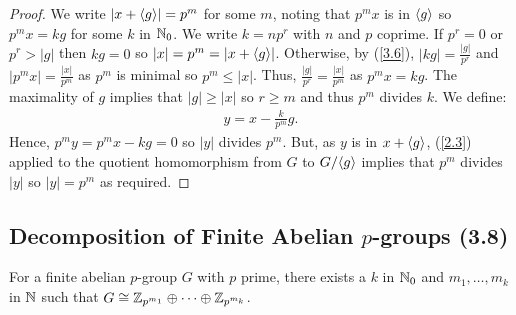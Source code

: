 \begin{proof}
    We write $|x + {\langle g \rangle}| = p^m$ for some $m$, noting that $p^mx$ 
    is in ${\langle g \rangle}$ so $p^mx = kg$ for some $k$ in $\mathbb{N}_0$. 
    We write $k = np^r$ with $n$ and $p$ coprime.
    If $p^r = 0$ or $p^r > |g|$ then $kg = 0$ so $|x| = p^m = |x + {\langle g \rangle}|$.
    Otherwise, by (\ref{3.6}), $|kg| = \frac{|g|}{p^r}$ and $|p^mx| = \frac{|x|}{p^m}$
    as $p^m$ is minimal so $p^m \leq |x|$.
    Thus, $\frac{|g|}{p^r} = \frac{|x|}{p^m}$ as $p^mx = kg$. The maximality of $g$ 
    implies that $|g| \geq |x|$ so $r \geq m$ and thus $p^m$ divides $k$.
    We define: \begin{align*}
        y = x - \frac{k}{p^m}g.
    \end{align*} Hence, $p^my = p^mx - kg = 0$ so $|y|$ divides $p^m$.
    But, as $y$ is in $x + {\langle g \rangle}$, (\ref{2.3}) applied to the quotient homomorphism
    from $G$ to $G / {\langle g \rangle}$ implies that $p^m$ divides $|y|$ so $|y| = p^m$ as required.
\end{proof}

\subsection{Decomposition of Finite Abelian $p$-groups (3.8)} \label{3.8}

For a finite abelian $p$-group $G$ with $p$ prime, there exists a $k$
in $\mathbb{N}_0$ and $m_1, \ldots, m_k$ in $\mathbb{N}$ such that 
$G \cong \mathbb{Z}_{p^{m_1}} \oplus \cdots \oplus \mathbb{Z}_{p^{m_k}}$.

